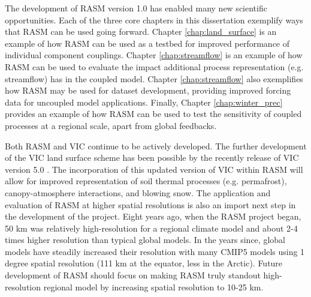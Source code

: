 The development of RASM version 1.0 has enabled many new scientific opportunities.
Each of the three core chapters in this dissertation exemplify ways that RASM can be used going forward.
Chapter \ref{chap:land_surface} is an example of how RASM can be used as a testbed for improved performance of individual component couplings.
Chapter \ref{chap:streamflow} is an example of how RASM can be used to evaluate the impact additional process representation (e.g. streamflow) has in the coupled model.
Chapter \ref{chap:streamflow} also exemplifies how RASM may be used for dataset development, providing improved forcing data for uncoupled model applications.
Finally, Chapter \ref{chap:winter_prec} provides an example of how RASM can be used to test the sensitivity of coupled processes at a regional scale, apart from global feedbacks.

Both RASM and VIC continue to be actively developed.
The further development of the VIC land surface scheme has been possible by the recently release of VIC version 5.0 \citep[see also \label{sec:vic_dev}]{Hamman_2016c,Hamman_2016d}.
The incorporation of this updated version of VIC within RASM will allow for improved representation of soil thermal processes (e.g. permafrost), canopy-atmosphere interactions, and blowing snow.
The application and evaluation of RASM at higher spatial resolutions is also an import next step in the development of the project.
Eight years ago, when the RASM project began, 50 km was relatively high-resolution for a regional climate model and about 2-4 times higher resolution than typical global models.
In the years since, global models have steadily increased their resolution with many CMIP5 models using 1 degree spatial resolution (111 km at the equator, less in the Arctic).
Future development of RASM should focus on making RASM truly standout high-resolution regional model by increasing spatial resolution to 10-25 km.
